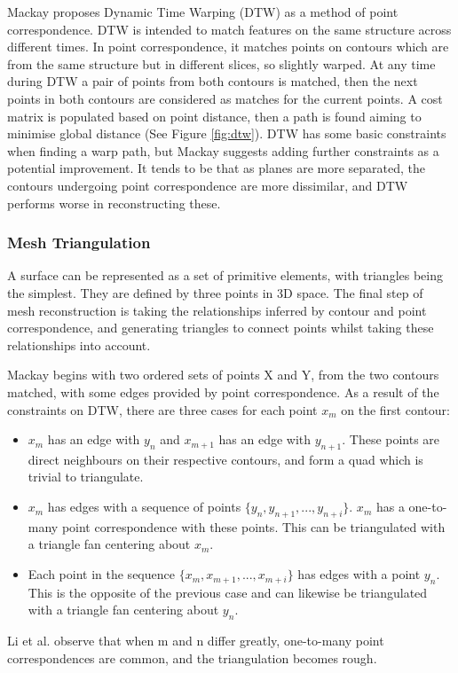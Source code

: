 \documentclass[11p, titlepage]{article}
\begin{document}
Mackay \cite{mackay2019robust} proposes Dynamic Time Warping (DTW) as a method of point correspondence. DTW is intended to match features on the same structure across different times. In point correspondence, it matches points on contours which are from the same structure but in different slices, so slightly warped. At any time during DTW a pair of points from both contours is matched, then the next points in both contours are considered as matches for the current points. A cost matrix is populated based on point distance, then a path is found aiming to minimise global distance (See Figure \ref{fig:dtw}). DTW has some basic constraints when finding a warp path, but Mackay suggests adding further constraints as a potential improvement. It tends to be that as planes are more separated, the contours undergoing point correspondence are more dissimilar, and DTW performs worse in reconstructing these.

\subsubsection{Mesh Triangulation}

A surface can be represented as a set of primitive elements, with triangles being the simplest. They are defined by three points in 3D space. The final step of mesh reconstruction is taking the relationships inferred by contour and point correspondence, and generating triangles to connect points whilst taking these relationships into account.

Mackay \cite{mackay2019robust} begins with two ordered sets of points X and Y, from the two contours matched, with some edges provided by point correspondence. As a result of the constraints on DTW, there are three cases for each point $x_{m}$ on the first contour:
\begin{itemize}
\item $x_{m}$ has an edge with $y_{n}$ and $x_{m+1}$ has an edge with $y_{n+1}$. These points are direct neighbours on their respective contours, and form a quad which is trivial to triangulate.
\item $x_{m}$ has edges with a sequence of points $\{y_{n}, y_{n+1}, ..., y_{n+i}\}$. $x_{m}$ has a one-to-many point correspondence with these points. This can be triangulated with a triangle fan centering about $x_{m}$.
\item Each point in the sequence $\{x_{m}, x_{m+1}, ..., x_{m+i}\}$ has edges with a point $y_{n}$. This is the opposite of the previous case and can likewise be triangulated with a triangle fan centering about $y_{n}$.
\end{itemize}
Li et al. \cite{li2021method} observe that when m and n differ greatly, one-to-many point correspondences are common, and the triangulation becomes rough.
\end{document}
